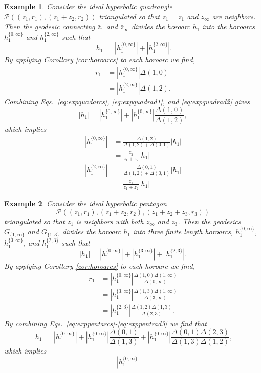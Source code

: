 \documentclass[10pt,a4paper]{article}
\newtheorem{example}{Example}
\newcommand{\G}[2]{G_{\{#1,#2\}}}
\newcommand{\h}[2]{h_{#1}^{\{#2\}}}
\newcommand{\z}[1]{\bar{z}_{#1}}
\newcommand{\len}[1]{\left\lvert #1 \right\rvert}
\begin{document}
\begin{example}
\normalfont Consider the ideal hyperbolic quadrangle $\mathcal{P}((z_1, r_1),(z_1+z_2, r_2))$ triangulated so that $\z{1} = z_1$ and $\z{\infty}$ are neighbors.  Then the geodesic connecting $\z{1}$ and $\z{\infty}$ divides the horoarc $h_1$ into the horoarcs $\h{1}{0,\infty}$ and $\h{1}{2,\infty}$ such that
\begin{equation}
\label{eq:expquadarcs}
    \len{h_1} = \len{\h{1}{0,\infty}} + \len{\h{1}{2,\infty}}.
\end{equation}
By applying Corollary \ref{cor:horoarcs} to each horoarc we find,
\begin{align}
        r_1 & = \len{\h{1}{0,\infty}} \Delta(1,0) \label{eq:expquadrad1} \\
        & = \len{\h{1}{2,\infty}} \Delta(1,2). \label{eq:expquadrad2}
\end{align}
Combining Eqs.\ \eqref{eq:expquadarcs}, \eqref{eq:expquadrad1}, and \eqref{eq:expquadrad2} gives 
\[
\len{h_1} = \len{\h{1}{0,\infty}} + \len{\h{1}{0,\infty}}\frac{\Delta(1,0)}{\Delta(1,2)}, 
\]
which implies 
\begin{align*}
    \len{\h{1}{0,\infty}} & = \frac{\Delta(1,2)}{\Delta(1,2) + \Delta(0,1)}\len{h_1} \\
    & = \frac{z_2}{z_1+z_2}\len{h_1} \\
    \len{\h{1}{2,\infty}} & = \frac{\Delta(0,1)}{\Delta(1,2)+\Delta(0,1)}\len{h_1} \\
    & = \frac{z_1}{z_1+z_2}\len{h_1} 
\end{align*}
\end{example}

\begin{example}
\normalfont Consider the ideal hyperbolic pentagon 
\[
\mathcal{P}((z_1,r_1),(z_1+z_2,r_2),(z_1+z_2+z_3,r_3))
\]
triangulated so that $\z{1}$ is neighbors with both $\z{\infty}$ and $\z{3}$. Then the geodesics $\G{1}{\infty}$ and $\G{1}{3}$ divides the horoarc $h_1$ into three finite length horoarcs, $\h{1}{0,\infty}$, $\h{1}{3,\infty}$, and $\h{1}{2,3}$ such that
\begin{equation}
\label{eq:exppentarcs}
    \len{h_1} = \len{\h{1}{0,\infty}}  + \len{\h{1}{3,\infty}} + \len{\h{1}{2,3}}.
\end{equation}
By applying Corollary \ref{cor:horoarcs} to each horoarc we find,
\begin{align}
        r_1 & = \len{\h{1}{0,\infty}} \frac{\Delta(1,0)\Delta(1,\infty)}{\Delta(0,\infty)} \label{eq:exppentrad1} \\
        & = \len{\h{1}{3,\infty}}\frac{\Delta(1,3)\Delta(1,\infty)}{\Delta(3,\infty)} \label{eq:exppentrad2} \\
        & = \len{\h{1}{2,3}} \frac{\Delta(1,2)\Delta(1,3)}{\Delta(2,3)}. \label{eq:exppentrad3}  
\end{align}
By combining Eqs.\ \eqref{eq:exppentarcs}-\eqref{eq:exppentrad3} we find that
\[
\len{h_1} = \len{\h{1}{0,\infty}} + \len{\h{1}{0,\infty}}\frac{\Delta(0,1)}{\Delta(1,3)} + \len{\h{1}{0,\infty}}\frac{\Delta(0,1)\Delta(2,3)}{\Delta(1,3)\Delta(1,2)},
\]
which implies
\[
\len{\h{1}{0,\infty}} = 
\]
\end{example}
\end{document}
